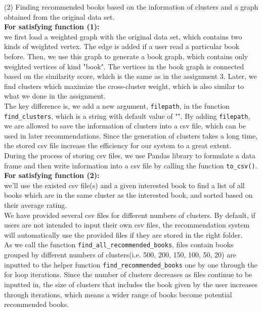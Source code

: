 \documentclass[fontsize=11pt]{article}
\begin{document}
(2) Finding recommended books based on the information of clusters and a graph obtained from the original data set.\\

\textbf{For satisfying function (1):}\\

we first load a weighted graph with the original data set, which contains two kinds of weighted vertex. The edge is added if a user read a particular book before. Then, we use this graph to generate a book graph, which contains only weighted vertices of kind "book". The vertices in the book graph is connected based on the similarity score, which is the same as in the assignment 3. Later, we find clusters which maximize the cross-cluster weight, which is also similar to what we done in the assignment.\\

The key difference is, we add a new argument, \texttt{filepath}, in the function \texttt{find\_clusters}, which is a string with default value of "". By adding \texttt{filepath}, we are allowed to save the information of clusters into a csv file, which can be used in later recommendations. Since the generation of clusters takes a long time, the stored csv file increase the efficiency for our system to a great extent.\\

During the process of storing csv files, we use Pandas library to formulate a data frame and then write information into a csv file by calling the function \texttt{to\_csv()}.\\

\textbf{For satisfying function (2):}\\

we'll use the existed csv file(s) and a given interested book to find a list of all books which are in the same cluster as the interested book, and sorted based on their average rating.\\

We have provided several csv files for different numbers of clusters. By default, if users are not intended to input their own csv files, the recommendation system will automatically use the provided files if they are stored in the right folder. \\

As we call the function \texttt{find\_all\_recommended\_books}, files contain books grouped by different numbers of clusters(i.e. 500, 200, 150, 100, 50, 20) are inputted to the helper function \texttt{find\_recommended\_books} one by one through the for loop iterations. Since the number of clusters decreases as files continue to be inputted in, the size of clusters that includes the book given by the user increases through iterations, which means a wider range of books become potential recommended books.\\
\end{document}
